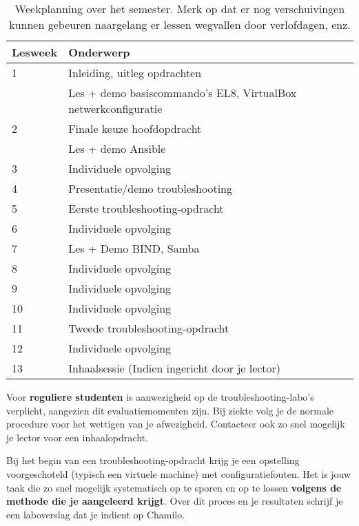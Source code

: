 \begin{table}
  \centering
  \begin{tabular}{ll}
    \toprule
    \textbf{Lesweek} & \textbf{Onderwerp}                                             \\
    \midrule
    1  & Inleiding, uitleg opdrachten                                   \\
       & Les + demo basiscommando's EL8, VirtualBox netwerkconfiguratie \\
    2  & Finale keuze hoofdopdracht                                     \\
       & Les + demo Ansible                                             \\
    3  & Individuele opvolging                                          \\
    4  & Presentatie/demo troubleshooting                               \\
    5  & Eerste troubleshooting-opdracht                                \\
    6  & Individuele opvolging                                          \\
    7  & Les + Demo BIND, Samba                                         \\
    8  & Individuele opvolging                                          \\
    9  & Individuele opvolging                                          \\
    10 & Individuele opvolging                                          \\
    11 & Tweede troubleshooting-opdracht                                \\
    12 & Individuele opvolging                                          \\
    13 & Inhaalsessie (Indien ingericht door je lector)
  \end{tabular}
  \caption{Weekplanning over het semester. Merk op dat er nog verschuivingen kunnen gebeuren naargelang er lessen wegvallen door verlofdagen, enz.}%
  \label{tab:weekplanning}
\end{table}

Voor \textbf{reguliere studenten} is aanwezigheid op de troubleshooting-labo's verplicht, aangezien dit evaluatiemomenten zijn. Bij ziekte volg je de normale procedure voor het wettigen van je afwezigheid. Contacteer ook zo snel mogelijk je lector voor een inhaalopdracht.

Bij het begin van een troubleshooting-opdracht krijg je een opstelling voorgeschoteld (typisch een virtuele machine) met configuratiefouten. Het is jouw taak die zo snel mogelijk systematisch op te sporen en op te lossen \textbf{volgens de methode die je aangeleerd krijgt}. Over dit proces en je resultaten schrijf je een laboverslag dat je indient op Chamilo.

